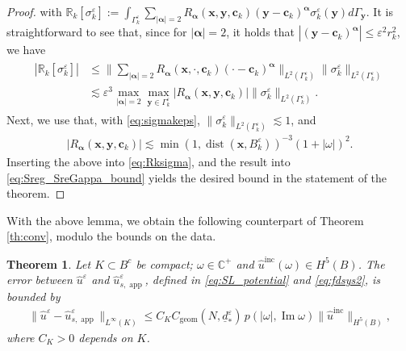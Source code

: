 \documentclass[]{article}
\newtheorem{theorem}{Theorem}
\numberwithin{equation}{section}
\numberwithin{theorem}{section}
\numberwithin{lemma}{section}
\numberwithin{corollary}{section}
\numberwithin{proposition}{section}
\numberwithin{definition}{section}
\newcommand{\bx}{\boldsymbol{x}}
\newcommand{\bc}{\boldsymbol{c}}
\newcommand{\re}{\varepsilon}
\renewcommand{\vec}{\boldsymbol}
\renewcommand{\Im}{\operatorname{Im}}
\newcommand{\inc}{\operatorname{inc}}
\begin{document}
\begin{proof}
		with $\mathbb{R}_k[\sigma^{\re}_k]:=\int_{\Gamma^{\re}_k} \sum_{|\vec{\alpha}|=2}R_{\vec{\alpha}}(\vec{x}, \vec{y}, \vec{c}_k)(\vec{y}-\vec{c}_k)^{\vec{\alpha}}\sigma_k^{\re}(\vec{y})d\Gamma_{\vec{y}}$. It is straightforward to see that, since for $|\vec{\alpha}|=2$, it holds that  $|(\vec{y}-\vec{c}_k)^{\vec{\alpha}}|\leq \re^2 r_k^2$, we have
		\begin{align}%
			\label{eq:Rksigma}
			\begin{split}
				|\mathbb{R}_k[\sigma^{\re}_k] |&\leq \| \sum_{|\vec{\alpha}| = 2} R_{\vec{\alpha}} (\bx, \cdot, \bc_k) (\cdot - \bc_k)^{\vec{\alpha}} \|_{L^2(\Gamma^{\re}_k)} \| \sigma^{\re}_k \|_{L^2(\Gamma^{\re}_k)} \\
				&\lesssim \re^3 \max_{|\vec{\alpha}|=2}\max_{\vec{y}\in \Gamma_k^{\re}}\left|R_{\vec{\alpha}}(\vec{x}, \vec{y}, \vec{c}_k)\right|   \| \sigma^{\re}_k \|_{L^2(\Gamma^{\re}_k)}.
			\end{split}
		\end{align}
		Next, we use that, with \eqref{eq:sigmakeps}, $\| \sigma^{\re}_k \|_{L^2(\Gamma^{\re}_k)} \lesssim 1$, and 
		\begin{align*}%
			\left|R_{\vec{\alpha}}(\vec{x}, \vec{y}, \vec{c}_k)\right|\lesssim 
			\min(1, \operatorname{dist}(\bx, B^{\re}_k))^{-3}(1+|\omega|)^2.
		\end{align*}
		Inserting the above into \eqref{eq:Rksigma}, and the result into \eqref{eq:Sreg_SreGappa_bound} yields the desired bound in the statement of the theorem. 
	\end{proof}
	With the above lemma, we obtain the following counterpart of Theorem \ref{th:conv}, modulo the bounds on the data. 
	\begin{theorem}
		\label{th:conv2}
		Let $K\subset B^c$ be compact; $\omega\in \mathbb{C}^+$ and $\hat{u}^{\inc}(\omega)\in H^5(B)$. The error between $\hat{u}^{\re}$ and $\hat{u}^{\re}_{s,\operatorname{app}}$, defined in \eqref{eq:SL_potential} and \eqref{eq:fdsys2}, is bounded by
		\begin{align*}
			\|\hat{u}^{\re} - \hat{u}^{\re}_{s, \operatorname{app}}\|_{L^{\infty}(K)}\leq C_KC_{\operatorname{geom}}(N, \underline{d}_*^{\re}) \, p(|\omega|, \Im \omega)\|\hat{u}^{\inc}\|_{H^5(B)},
		\end{align*}
		where $C_K>0$ depends on $K$.
	\end{theorem}
\end{document}
